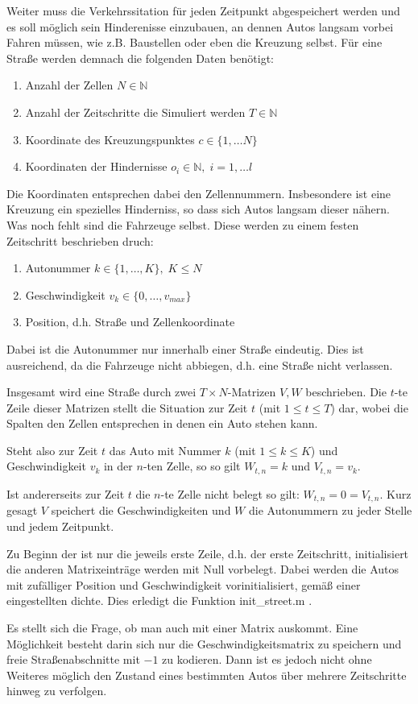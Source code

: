 Weiter muss die Verkehrssitation für jeden Zeitpunkt abgespeichert werden und
es soll möglich sein Hinderenisse einzubauen, an dennen Autos langsam vorbei Fahren müssen, 
wie z.B. Baustellen oder eben die Kreuzung selbst. 
Für eine Straße werden demnach die folgenden Daten benötigt:
\begin{enumerate}
  \item Anzahl der Zellen \(N \in \mathbb{N}\)
  \item Anzahl der Zeitschritte die Simuliert werden \(T \in \mathbb{N}\)
  \item Koordinate des Kreuzungspunktes \(c \in \{ 1, \ldots N \}\)
  \item Koordinaten der Hindernisse \(o_i \in \mathbb{N}, \; i = 1, \ldots l\)
\end{enumerate}
Die Koordinaten entsprechen dabei den Zellennummern. Insbesondere ist eine Kreuzung ein spezielles Hinderniss,
so dass sich Autos langsam dieser nähern. 
Was noch fehlt sind die Fahrzeuge selbst. Diese werden zu einem festen Zeitschritt beschrieben druch:
\begin{enumerate}
  \item Autonummer \(k \in \{ 1, \ldots, K \}, \; K \leq N\) 
  \item Geschwindigkeit \(v_k \in \{0, \ldots, v_{max} \}\)
  \item Position, d.h. Straße und Zellenkoordinate
\end{enumerate}
Dabei ist die Autonummer nur innerhalb einer Straße eindeutig. Dies ist ausreichend, da die Fahrzeuge nicht 
abbiegen, d.h. eine Straße nicht verlassen.

Insgesamt wird eine Straße durch zwei \(T \times N\)-Matrizen \(V, W\) beschrieben.
Die \(t\)-te Zeile dieser Matrizen stellt die Situation zur Zeit \(t\) (mit \(1 \leq t \leq T\)) dar, 
wobei die Spalten den Zellen entsprechen in denen ein Auto stehen kann. 

Steht also zur Zeit \(t\) das Auto mit Nummer \(k\) (mit \(1 \leq k \leq K\)) und Geschwindigkeit \(v_k\) in der \(n\)-ten Zelle, 
so so gilt \( W_{t, n} = k\) und \(V_{t, n} = v_k\). 

Ist andererseits zur Zeit \(t\) die \(n\)-te Zelle nicht belegt so gilt: \(W_{t, n} = 0 = V_{t, n}\).
Kurz gesagt \(V\) speichert die Geschwindigkeiten und \(W\) die Autonummern zu jeder Stelle und jedem Zeitpunkt.

Zu Beginn der ist nur die jeweils erste Zeile, d.h. der erste Zeitschritt, initialisiert die anderen Matrixeinträge
werden mit Null vorbelegt. Dabei werden die Autos mit zufälliger Position und Geschwindigkeit vorinitialisiert, gemäß
einer eingestellten dichte. Dies erledigt die Funktion init\_street.m .

Es stellt sich die Frage, ob man auch mit einer Matrix auskommt. Eine Möglichkeit besteht darin sich nur die Geschwindigkeitsmatrix 
zu speichern und freie Straßenabschnitte mit \(-1\) zu kodieren. Dann ist es jedoch nicht ohne Weiteres möglich den Zustand eines bestimmten Autos über
mehrere Zeitschritte hinweg zu verfolgen.
